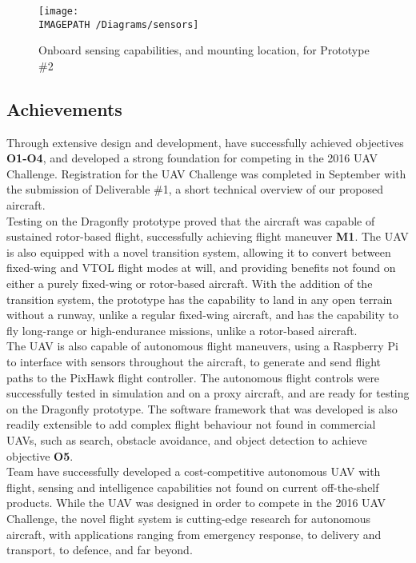 \begin{figure}[!ht]
	\centering
	\texttt{[image: \\IMAGEPATH /Diagrams/sensors]}
	\caption{Onboard sensing capabilities, and mounting location, for Prototype \#2}
	\label{fig:sensing-exec}
\end{figure}


\subsection{Achievements}
Through extensive design and development, \ID have successfully achieved objectives \textbf{O1-O4}, and developed a strong foundation for competing in the 2016 UAV Challenge. Registration for the UAV Challenge was completed in September with the submission of Deliverable \#1, a short technical overview of our proposed aircraft.\\

Testing on the Dragonfly prototype proved that the aircraft was capable of sustained rotor-based flight, successfully achieving flight maneuver \textbf{M1}. The UAV is also equipped with a novel transition system, allowing it to convert between fixed-wing and VTOL flight modes at will, and providing benefits not found on either a purely fixed-wing or rotor-based aircraft. With the addition of the transition system, the prototype has the capability to land in any open terrain without a runway, unlike a regular fixed-wing aircraft, and has the capability to fly long-range or high-endurance missions, unlike a rotor-based aircraft.\\

The UAV is also capable of autonomous flight maneuvers, using a Raspberry Pi to interface with sensors throughout the aircraft, to generate and send flight paths to the PixHawk flight controller. The autonomous flight controls were successfully tested in simulation and on a proxy aircraft, and are ready for testing on the Dragonfly prototype. The software framework that was developed is also readily extensible to add complex flight behaviour not found in commercial UAVs, such as search, obstacle avoidance, and object detection to achieve objective \textbf{O5}.\\

Team \ID have successfully developed a cost-competitive autonomous UAV with flight, sensing and intelligence capabilities not found on current off-the-shelf products. While the UAV was designed in order to compete in the 2016 UAV Challenge, the novel flight system is cutting-edge research for autonomous aircraft, with applications ranging from emergency response, to delivery and transport, to defence, and far beyond.

